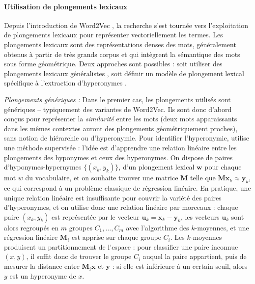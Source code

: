 \paragraph{Utilisation de plongements lexicaux}
 
Depuis l'introduction de Word2Vec \cite{mikolov2013distributed}, la recherche s'est tournée vers l'exploitation de plongements lexicaux pour représenter vectoriellement les termes. Les plongements lexicaux sont des représentations denses des mots, généralement obtenus à partir de très grands corpus et qui intègrent la sémantique des mots sous forme géométrique.
Deux approches sont possibles : soit utiliser des plongements lexicaux généralistes \cite{fu2014learning, gupta2016domain, atzori2020fully, pocostales-2016-nuig}, soit définir un modèle de plongement lexical spécifique à l'extraction d'hyperonymes \cite{nguyen-etal-2017-hierarchical, nickel2017poincare, nickel2018learning, yu2015learning, luu-etal-2016-learning, vendrov2015order}. 

\textit{Plongements génériques :}
Dans le premier cas, les plongements utilisés sont génériques – typiquement des variantes de Word2Vec. Ils sont donc d'abord conçus pour représenter la \textit{similarité} entre les mots (deux mots apparaissants dans les mêmes contextes auront des plongements géométriquement proches), sans notion de hiérarchie ou d'hyperonymie. Pour identifier l'hyperonymie, \cite{fu2014learning} utilise une méthode supervisée : l'idée est d'apprendre une relation linéaire entre les plongements des hyponymes et ceux des hyperonymes. On dispose de paires d'hyponymes-hypernymes $\{(x_k, y_k )\}$, d'un plongement lexical $\textbf{w}$ pour chaque mot $w$ du vocabulaire, et on souhaite trouver une matrice $\textbf{M}$ telle que $\textbf{M} \textbf{x}_k \approx \textbf{y}_k$, ce qui correspond à un problème classique de régression linéaire. En pratique, une unique relation linéaire est insuffisante pour couvrir la variété des paires d'hyperonymes, et on utilise donc une relation linéaire par morceaux : chaque paire $(x_k, y_k)$ est représentée par le vecteur $\textbf{u}_k = \textbf{x}_k - \textbf{y}_k$, les vecteurs $\textbf{u}_k$ sont alors regroupés en $m$ groupes $C_1, \ldots, C_m$ avec l'algorithme des $k$-moyennes, et une régression linéaire $\textbf{M}_i$ est apprise sur chaque groupe $C_i$. Les $k$-moyennes produisent un partitionnement de l'espace : pour classifier une paire inconnue $(x, y)$, il suffit donc de trouver le groupe $C_i$ auquel la paire appartient, puis de mesurer la distance entre $\textbf{M}_i \textbf{x}$ et $\textbf{y}$ : si elle est inférieure à un certain seuil, alors $y$ est un hyperonyme de $x$.

